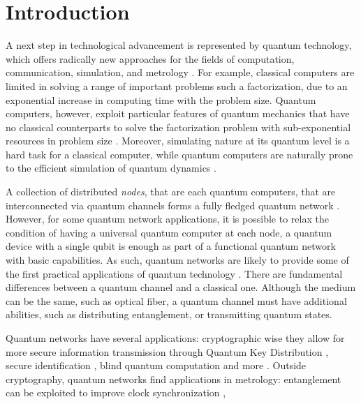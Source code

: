 \documentclass[english, a4paper, 12pt, twoside]{book}
\numberwithin{equation}{section} %
\begin{document}
\newpage
\tableofcontents


\newpage
{} %
\setcounter{page}{1} %


\chapter{Introduction} %
A next step in technological advancement is represented by quantum technology, which offers radically new approaches for the fields of computation, communication, simulation, and metrology \cite{quantumtech}. For example, classical computers are limited in solving a range of important problems such a factorization, due to an exponential increase in computing time with the problem size. Quantum computers, however, exploit particular features of quantum mechanics that have no classical counterparts to solve the factorization problem with sub-exponential resources in problem size \cite{shor}. Moreover, simulating nature at its quantum level is a hard task for a classical computer, while quantum computers are naturally prone to the efficient simulation of quantum dynamics \cite{RevModPhys.86.153}.\par
A collection of distributed \emph{nodes}, that are each quantum computers, that are interconnected via quantum channels forms a fully fledged quantum network \cite{kimble}. However, for some quantum network applications, it is possible to relax the condition of having a universal quantum computer at each node, a quantum device with a single qubit is enough as part of a functional quantum network with basic capabilities. As such, quantum networks are likely to provide some of the first practical applications of quantum technology \cite{Wehnereaam9288}. There are fundamental differences between a quantum channel and a classical one. Although the medium can be the same, such as optical fiber, a quantum channel must have additional abilities, such as distributing entanglement, or transmitting quantum states.\par
Quantum networks have several applications: cryptographic wise they allow for more secure information transmission through Quantum Key Distribution \cite{qkd2}, secure identification \cite{secureident}, blind quantum computation \cite{blindcomputation} and more \cite{Wehnereaam9288}. Outside cryptography, quantum networks find applications in metrology: entanglement can be exploited to improve clock synchronization \cite{quantumclocks},
\end{document}
